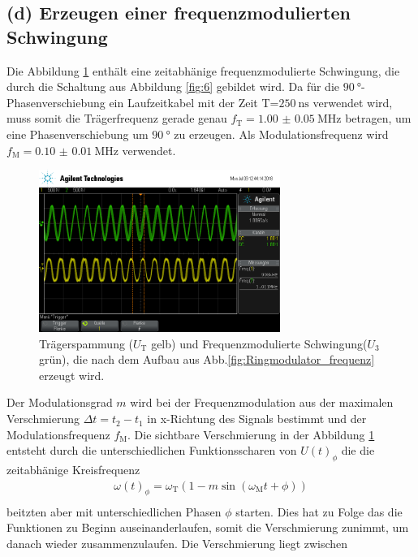 \FloatBarrier
\subsection{(d) Erzeugen einer frequenzmodulierten Schwingung}
\label{subsec:auswertung_d}
Die Abbildung \ref{fig:freq_zeit} enthält eine zeitabhänige frequenzmodulierte
Schwingung, die durch die Schaltung aus Abbildung \ref{fig:6}
gebildet wird.
Da für die  $\SI{90}{\degree}$-Phasenverschiebung ein Laufzeitkabel mit der
Zeit T=$\SI{250}{\nano\second}$ verwendet wird, muss somit die
Trägerfrequenz gerade genau $f_{\text{T}} = \SI{1.00(5)}{\mega\hertz}$
betragen, um eine Phasenverschiebung um $\SI{90}{\degree}$
zu erzeugen. Als Modulationsfrequenz wird
$f_{\text{M}}=\SI{0.10(1)}{\mega\hertz}$ verwendet.

\begin{figure}
  \centering
  \includegraphics[width=0.7\textwidth]{osci/freq_mod.png}
  \caption{Trägerspammung ($U_{\text{T}}$ gelb) und Frequenzmodulierte
  Schwingung($U_3$ grün), die nach dem Aufbau aus Abb.\ref{fig:Ringmodulator_frequenz} erzeugt wird.}
  \label{fig:freq_zeit}
\end{figure}
Der Modulationsgrad $m$ wird
bei der Frequenzmodulation
aus der maximalen Verschmierung
$\Delta t=t_2-t_1$ in x-Richtung des Signals bestimmt
und der Modulationsfrequenz $f_{\text{M}}$.
Die sichtbare Verschmierung in der
Abbildung \ref{fig:freq_zeit}
entsteht durch die unterschiedlichen
Funktionsscharen von $U(t)_{\phi}$ die
die zeitabhänige Kreisfrequenz
\begin{align}
\omega(t)_{\phi}=\omega_\text{T}\left(1-m\sin(\omega_\text{M}t + \phi)\right)\\
\end{align}
beitzten aber mit unterschiedlichen Phasen $\phi$ starten.
Dies hat zu Folge das die Funktionen zu Beginn
auseinanderlaufen, somit die Verschmierung
zunimmt, um danach wieder
zusammenzulaufen.
Die Verschmierung liegt zwischen
